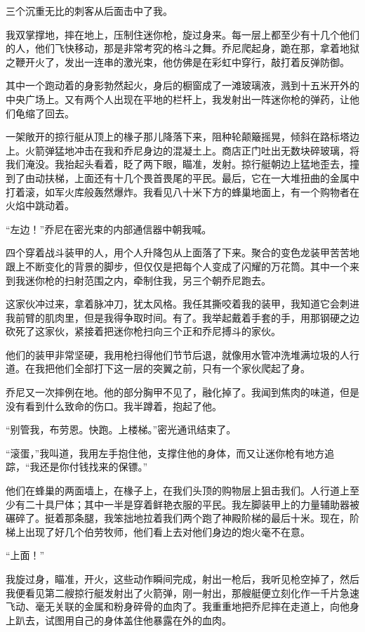 \documentclass[AutoFakeBold=true]{book}
\begin{document}
三个沉重无比的刺客从后面击中了我。

我双掌撑地，摔在地上，压制住迷你枪，旋过身来。每一层上都至少有十几个他们的人，他们飞快移动，那是非常考究的格斗之舞。乔尼爬起身，跪在那，拿着地狱之鞭开火了，发出一连串的激光束，他仿佛是在彩虹中穿行，敲打着反弹防御。

其中一个跑动着的身影勃然起火，身后的橱窗成了一滩玻璃液，溅到十五米开外的中央广场上。又有两个人出现在平地的栏杆上，我发射出一阵迷你枪的弹药，让他们龟缩了回去。

一架敞开的掠行艇从顶上的椽子那儿降落下来，阻种轮颠簸摇晃，倾斜在路标塔边上。火箭弹猛地冲击在我和乔尼身边的混凝土上。商店正门吐出无数块碎玻璃，将我们淹没。我抬起头看着，眨了两下眼，瞄准，发射。掠行艇朝边上猛地歪去，撞到了由动扶梯，上面还有十几个畏首畏尾的平民。最后，它在一大堆扭曲的金属中打着滚，如军火库般轰然爆炸。我看见八十米下方的蜂巢地面上，有一个购物者在火焰中跳动着。

``左边！''乔尼在密光束的内部通信器中朝我喊。

四个穿着战斗装甲的人，用个人升降包从上面落了下来。聚合的变色龙装甲苦苦地跟上不断变化的背景的脚步，但仅仅是把每个人变成了闪耀的万花筒。其中一个来到我迷你枪的扫射范围之内，牵制住我，另三个朝乔尼跑去。

这家伙冲过来，拿着脉冲刀，犹太风格。我任其撕咬着我的装甲，我知道它会刺进我前臂的肌肉里，但是我得争取时间。有了。我举起戴着手套的手，用那钢硬之边砍死了这家伙，紧接着把迷你枪扫向三个正和乔尼搏斗的家伙。

他们的装甲非常坚硬，我用枪扫得他们节节后退，就像用水管冲洗堆满垃圾的人行道。在我把他们全部打下这一层的突翼之前，只有一个家伙爬起了身。

乔尼又一次摔例在地。他的部分胸甲不见了，融化掉了。我闻到焦肉的味道，但是没有看到什么致命的伤口。我半蹲着，抱起了他。

``别管我，布劳恩。快跑。上楼梯。''密光通讯结束了。

``滚蛋，''我叫道，我用左手抱住他，支撑住他的身体，而又让迷你枪有地方追踪，``我还是你付钱找来的保镖。''

他们在蜂巢的两面墙上，在椽子上，在我们头顶的购物层上狙击我们。人行道上至少有二十具尸体；其中一半是穿着鲜艳衣服的平民。我左脚装甲上的力量辅助器被碾碎了。挺着那条腿，我笨拙地拉着我们两个跑了神殿阶梯的最后十米。现在，阶梯上出现了好几个伯劳牧师，他们看上去对他们身边的炮火毫不在意。

``上面！''

我旋过身，瞄准，开火，这些动作瞬间完成，射出一枪后，我听见枪空掉了，然后我便看见第二艘掠行艇发射出了火箭弹，刚一射出，那艘艇便立刻化作一千片急速飞动、毫无关联的金属和粉身碎骨的血肉了。我重重地把乔尼摔在走道上，向他身上趴去，试图用自己的身体盖住他暴露在外的血肉。
\end{document}
